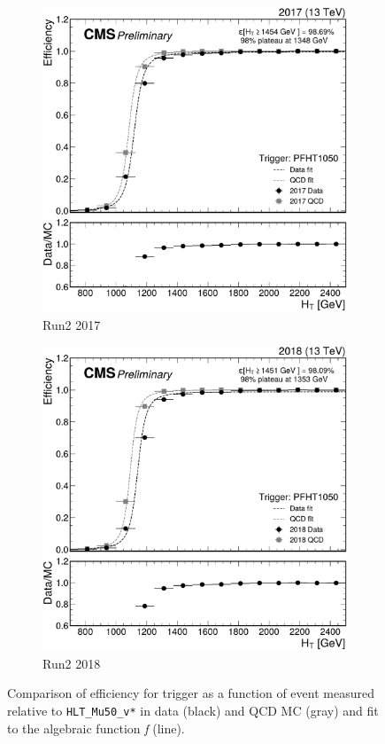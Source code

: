 \begin{figure}[h]
	\begin{subfigure}{.45\textwidth}
		\includegraphics[width=\linewidth]{Images/pdfs/17_efficiency_withratio_and_fits.pdf}
		\caption{Run2 2017}
		\label{fig:HT_eff_17}
	\end{subfigure}
	\begin{subfigure}{.45\textwidth}
		\includegraphics[width=\linewidth]{Images/pdfs/18_efficiency_withratio_and_fits.pdf}
		\caption{Run2 2018}
		\label{fig:HT_eff_18}
	\end{subfigure}
	\caption[Comparison of trigger efficiencies for \HT trigger]{Comparison of efficiency for \HT trigger as a function of event \HT measured relative to \texttt{HLT\_Mu50\_v*} in data (black) and QCD MC (gray) and fit to the algebraic function \textit{f} (line).}
	\label{fig:HT_efficiencies}
\end{figure}

